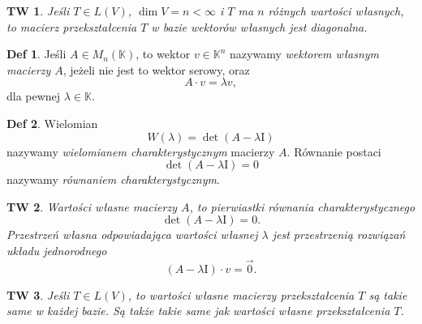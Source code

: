 \documentclass[a4paper, 12pt]{mwart}
\newcommand*{\im}{\mathrm{I}}
\theoremstyle{definition}
\newtheorem{definicja}{Def}[section]
\theoremstyle{plain}
\newtheorem{twierdzenie}{TW}[section]
\theoremstyle{remark}
\begin{document}
\begin{twierdzenie}
	Jeśli $T \in L(V)$, $\dim V = n < \infty$ i $T$ ma $n$ różnych wartości własnych, to macierz przekształcenia $T$ w bazie wektorów własnych jest diagonalna.
\end{twierdzenie}
\begin{definicja}
	Jeśli $A \in M_n(\mathbb{K})$, to wektor $v \in \mathbb{K}^n$ nazywamy \emph{wektorem własnym macierzy $A$}, jeżeli nie jest to wektor serowy, oraz
	\begin{equation}
		A \cdot v = \lambda v,
	\end{equation}
	dla pewnej $\lambda \in \mathbb{K}$.
\end{definicja}
\begin{definicja}
	Wielomian
	\begin{equation}
		W(\lambda) = \det (A - \lambda \im)
	\end{equation}
	nazywamy \emph{wielomianem charakterystycznym} macierzy $A$. Równanie postaci
	\begin{equation}
		\det (A - \lambda \im) = 0
	\end{equation}
	nazywamy \emph{równaniem charakterystycznym}.
\end{definicja}
\begin{twierdzenie}
	Wartości własne macierzy $A$, to pierwiastki równania charakterystycznego
	\begin{equation}
		\det (A - \lambda \im) = 0.
	\end{equation}
	Przestrzeń własna odpowiadająca wartości własnej $\lambda$ jest przestrzenią rozwiązań układu jednorodnego
	\begin{equation}
		(A - \lambda \im) \cdot v = \vec 0.
	\end{equation}
\end{twierdzenie}
\begin{twierdzenie} %
	Jeśli $T \in L(V)$, to wartości własne macierzy przekształcenia $T$ są takie same w każdej bazie. Są także takie same jak wartości własne przekształcenia $T$.
\end{twierdzenie}
\end{document}

